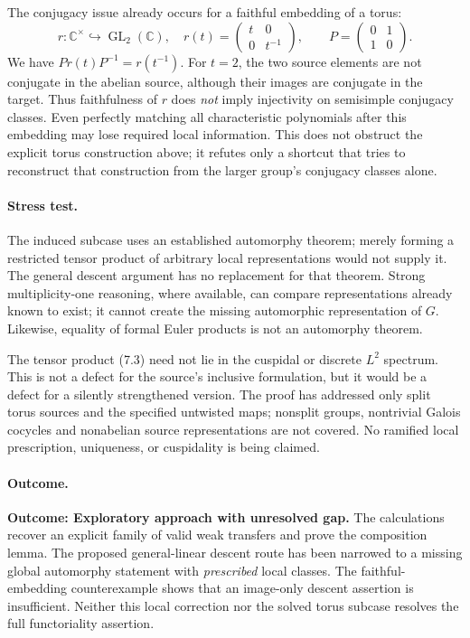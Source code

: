 \documentclass[11pt,a4paper]{article}
\newcommand{\C}{\mathbb{C}}
\begin{document}
The conjugacy issue already occurs for a faithful embedding of a torus:
\[
 r:\C^\times\hookrightarrow\operatorname{GL}_2(\C),\quad
 r(t)=\begin{pmatrix}t&0\\0&t^{-1}\end{pmatrix},\qquad
 P=\begin{pmatrix}0&1\\1&0\end{pmatrix}.
 \tag{7.5}
\]
We have $Pr(t)P^{-1}=r(t^{-1})$. For $t=2$, the two source elements are
not conjugate in the abelian source, although their images are conjugate
in the target. Thus faithfulness of $r$ does \emph{not} imply injectivity
on semisimple conjugacy classes. Even perfectly matching all characteristic
polynomials after this embedding may lose required local information.
This does not obstruct the explicit torus construction above; it refutes
only a shortcut that tries to reconstruct that construction from the
larger group's conjugacy classes alone.

\paragraph{Stress test.}
The induced subcase uses an established automorphy theorem; merely
forming a restricted tensor product of arbitrary local representations
would not supply it. The general descent argument has no replacement
for that theorem. Strong multiplicity-one reasoning, where available,
can compare representations already known to exist; it cannot create
the missing automorphic representation of $G$. Likewise, equality of
formal Euler products is not an automorphy theorem.

The tensor product (7.3) need not lie in the cuspidal or discrete
$L^2$ spectrum. This is not a defect for the source's inclusive
formulation, but it would be a defect for a silently strengthened
version. The proof has addressed only split torus sources and the
specified untwisted maps; nonsplit groups, nontrivial Galois cocycles
and nonabelian source representations are not covered. No ramified
local prescription, uniqueness, or cuspidality is being claimed.

\paragraph{Outcome.}
\textbf{Outcome: Exploratory approach with unresolved gap.}
The calculations recover an explicit family of valid weak transfers
and prove the composition lemma. The proposed general-linear descent
route has been narrowed to a missing global automorphy statement with
\emph{prescribed} local classes. The faithful-embedding counterexample
shows that an image-only descent assertion is insufficient. Neither
this local correction nor the solved torus subcase resolves the full
functoriality assertion.
\end{document}
